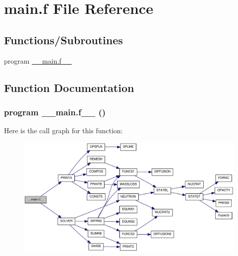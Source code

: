 \hypertarget{main_8f}{
\section{main.f File Reference}
\label{main_8f}
}
\subsection*{Functions/Subroutines}
\begin{DoxyCompactItemize}
\item 
program \hyperlink{main_8f_ae83ca6745076513ebf744d3378720f23}{\_\-\_\-main.f\_\-\_\-}
\end{DoxyCompactItemize}


\subsection{Function Documentation}
\hypertarget{main_8f_ae83ca6745076513ebf744d3378720f23}{
\subsubsection[{\_\-\_\-main.f\_\-\_\-}]{\setlength{\rightskip}{0pt plus 5cm}program \_\-\_\-main.f\_\-\_\- ()}}
\label{main_8f_ae83ca6745076513ebf744d3378720f23}


Here is the call graph for this function:\nopagebreak
\begin{figure}[H]
\begin{center}
\leavevmode
\includegraphics[width=354pt]{main_8f_ae83ca6745076513ebf744d3378720f23_cgraph}
\end{center}
\end{figure}
